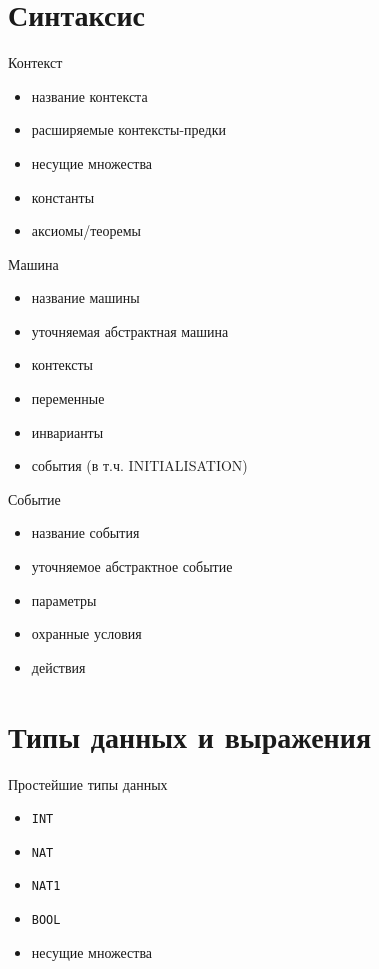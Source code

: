 \documentclass[hyperref={unicode=true}]{beamer}
\begin{document}
	\section{Синтаксис}

	\begin{frame}{Контекст}
		\begin{itemize}
			\item название контекста
			\item расширяемые контексты-предки
			\item несущие множества
			\item константы
			\item аксиомы/теоремы
		\end{itemize}
	\end{frame}

	\begin{frame}{Машина}
		\begin{itemize}
			\item название машины
			\item уточняемая абстрактная машина
			\item контексты
			\item переменные
			\item инварианты
			\item события (в т.ч. INITIALISATION)
		\end{itemize}
	\end{frame}

	\begin{frame}{Событие}
		\begin{itemize}
			\item название события
			\item уточняемое абстрактное событие
			\item параметры
			\item охранные условия
			\item действия
		\end{itemize}
	\end{frame}	

	\section{Типы данных и выражения}

	\begin{frame}{Простейшие типы данных}
		\begin{itemize}
			\item \texttt{INT}
			\item \texttt{NAT}
			\item \texttt{NAT1}
			\item \texttt{BOOL}
			\item несущие множества
		\end{itemize}
	\end{frame}
\end{document}
